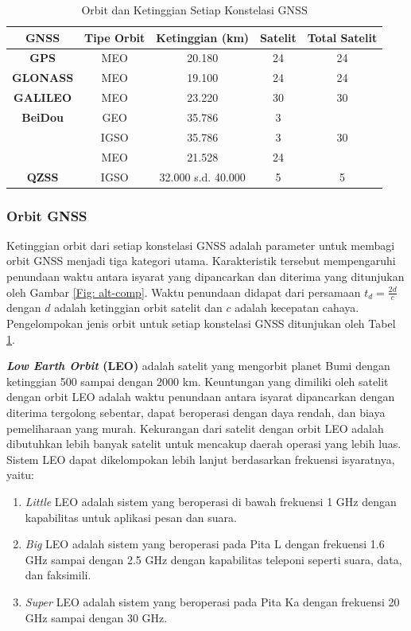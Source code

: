 \begin{table}[H]
	\caption{Orbit dan Ketinggian Setiap Konstelasi GNSS \cite{Li2019, Bury2019}}
	\vspace{0.5em}
	\centering
	\begin{tabular}{ccccc}
		\hline
		\textbf{GNSS} &\textbf{Tipe Orbit} & \textbf{Ketinggian (km)} & \textbf{Satelit} & \textbf{Total Satelit}\\
		\hline 
		\textbf{GPS} & MEO & 20.180 & 24 & 24\\
		\textbf{GLONASS} & MEO & 19.100 & 24 & 24\\
		\textbf{GALILEO} & MEO & 23.220 & 30 & 30\\
		\textbf{BeiDou} & GEO & 35.786 & 3\\
		& IGSO & 35.786 & 3 & 30\\
		& MEO& 21.528 & 24\\
		\textbf{QZSS} & IGSO &32.000 s.d. 40.000 & 5 & 5\\
		\hline
	\end{tabular}
	\label{Tab: gnss-orbit}
\end{table}

\subsubsection{Orbit GNSS}
Ketinggian orbit dari setiap konstelasi GNSS adalah parameter untuk membagi orbit GNSS menjadi tiga kategori utama. Karakteristik tersebut mempengaruhi penundaan waktu antara isyarat yang dipancarkan dan diterima yang ditunjukan oleh Gambar \ref{Fig: alt-comp}. Waktu penundaan didapat dari persamaan $t_d = \frac{2d}{c}$ dengan $d$ adalah ketinggian orbit satelit dan $c$ adalah kecepatan cahaya. Pengelompokan jenis orbit untuk setiap konstelasi GNSS ditunjukan oleh Tabel \ref{Tab: gnss-orbit}.

\textbf{\textit{Low Earth Orbit} (LEO)} adalah satelit yang mengorbit planet Bumi dengan ketinggian 500 sampai dengan 2000 km. Keuntungan yang dimiliki oleh satelit dengan orbit LEO adalah waktu penundaan antara isyarat dipancarkan dengan diterima tergolong sebentar, dapat beroperasi dengan daya rendah, dan biaya pemeliharaan yang murah. Kekurangan dari satelit dengan orbit LEO adalah dibutuhkan lebih banyak satelit untuk mencakup daerah operasi yang lebih luas. Sistem LEO dapat dikelompokan lebih lanjut berdasarkan frekuensi isyaratnya, yaitu:

\begin{enumerate}
	\item \textit{Little} LEO adalah sistem yang beroperasi di bawah frekuensi 1 GHz dengan kapabilitas untuk aplikasi pesan dan suara.
	\item \textit{Big} LEO adalah sistem yang beroperasi pada Pita L dengan frekuensi 1.6 GHz sampai dengan 2.5 GHz dengan kapabilitas teleponi seperti suara, data, dan faksimili.
	\item \textit{Super} LEO adalah sistem yang beroperasi pada Pita Ka dengan frekuensi 20 GHz sampai dengan 30 GHz.
\end{enumerate}

